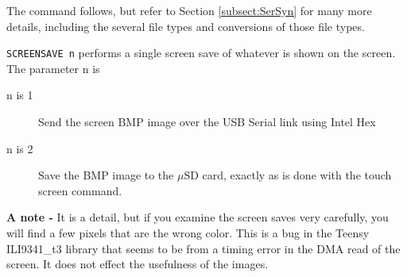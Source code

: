  The command follows, but refer to Section \ref{subsect:SerSyn} for many more details, including the several file types and conversions of those file types.

\texttt{SCREENSAVE n} performs a single screen save of whatever is shown on the screen.  The parameter n is
\begin{description}
\item[n is 1] Send the screen BMP image over the USB Serial link using Intel Hex
\item[n is 2] Save the BMP image to the $\mu$SD card, exactly as is done with the touch screen command.
\end{description}

\textbf{A note - }It is a detail, but if you examine the screen saves very carefully, you will find a few pixels that are the wrong color. This is a bug in the Teensy ILI9341\_t3 library that seems to be from a timing error in the DMA read of the screen. It does not effect the usefulness of the images.
